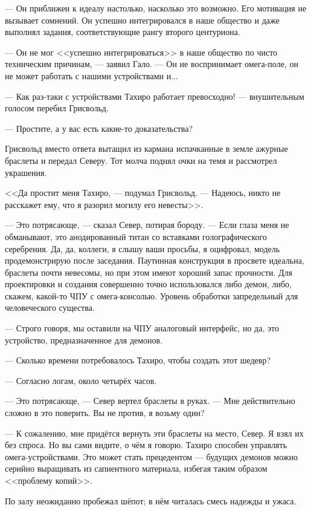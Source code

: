 --- Он приближен к идеалу настолько, насколько это возможно.
Его мотивация не вызывает сомнений.
Он успешно интегрировался в наше общество и даже выполнял задания, соответствующие рангу второго центуриона.

--- Он не мог <<успешно интегрироваться>> в наше общество по чисто техническим причинам, --- заявил Гало.
--- Он не воспринимает омега-поле, он не может работать с нашими устройствами и...

--- Как раз-таки с устройствами Тахиро работает превосходно! --- внушительным голосом перебил Грисвольд.

--- Простите, а у вас есть какие-то доказательства?

Грисвольд вместо ответа вытащил из кармана испачканные в земле ажурные браслеты и передал Северу.
Тот молча поднял очки на темя и рассмотрел украшения.

<<Да простит меня Тахиро, --- подумал Грисвольд.
--- Надеюсь, никто не расскажет ему, что я разорил могилу его невесты>>.

--- Это потрясающе, --- сказал Север, потирая бороду.
--- Если глаза меня не обманывают, это анодированный титан со вставками голографического серебрения.
Да, да, коллеги, я слышу ваши просьбы, я оцифровал, модель продемонстрирую после заседания.
Паутинная конструкция в просвете идеальна, браслеты почти невесомы, но при этом имеют хороший запас прочности.
Для проектировки и создания совершенно точно использовался либо демон, либо, скажем, какой-то ЧПУ с омега-консолью.
Уровень обработки запредельный для человеческого существа.

--- Строго говоря, мы оставили на ЧПУ аналоговый интерфейс, но да, это устройство, предназначенное для демонов.

--- Сколько времени потребовалось Тахиро, чтобы создать этот шедевр?

--- Согласно логам, около четырёх часов.

--- Это потрясающе, --- Север вертел браслеты в руках.
--- Мне действительно сложно в это поверить.
Вы не против, я возьму один?

--- К сожалению, мне придётся вернуть эти браслеты на место, Север.
Я взял их без спроса.
Но вы сами видите, о чём я говорю.
Тахиро способен управлять омега-устройствами.
Это может стать прецедентом --- будущих демонов можно серийно выращивать из сапиентного материала, избегая таким образом <<проблему копий>>.

По залу неожиданно пробежал шёпот;
в нём читалась смесь надежды и ужаса.

